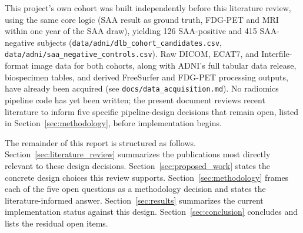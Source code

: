 This project's own cohort was built independently before this literature review, using the same core logic (SAA result as ground truth, FDG-PET and MRI within one year of the SAA draw), yielding 126 SAA-positive and 415 SAA-negative subjects (\texttt{data/adni/dlb\_cohort\_candidates.csv}, \texttt{data/adni/saa\_negative\_controls.csv}). Raw DICOM, ECAT7, and Interfile-format image data for both cohorts, along with ADNI's full tabular data release, biospecimen tables, and derived FreeSurfer and FDG-PET processing outputs, have already been acquired (see \texttt{docs/data\_acquisition.md}). No radiomics pipeline code has yet been written; the present document reviews recent literature to inform five specific pipeline-design decisions that remain open, listed in Section~\ref{sec:methodology}, before implementation begins.

The remainder of this report is structured as follows. Section~\ref{sec:literature_review} summarizes the publications most directly relevant to these design decisions. Section~\ref{sec:proposed_work} states the concrete design choices this review supports. Section~\ref{sec:methodology} frames each of the five open questions as a methodology decision and states the literature-informed answer. Section~\ref{sec:results} summarizes the current implementation status against this design. Section~\ref{sec:conclusion} concludes and lists the residual open items.
